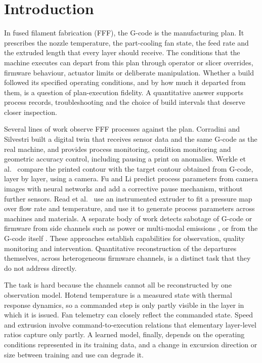 \documentclass[10pt,a4paper,twocolumn]{article}
\begin{document}
\section{Introduction}
In fused filament fabrication (FFF), the G-code is the manufacturing plan. It prescribes the nozzle temperature, the part-cooling fan state, the feed rate and the extruded length that every layer should receive. The conditions that the machine executes can depart from this plan through operator or slicer overrides, firmware behaviour, actuator limits or deliberate manipulation. Whether a build followed its specified operating conditions, and by how much it departed from them, is a question of plan-execution fidelity. A quantitative answer supports process records, troubleshooting and the choice of build intervals that deserve closer inspection.

Several lines of work observe FFF processes against the plan. Corradini and Silvestri \cite{Corradini2022} built a digital twin that receives sensor data and the same G-code as the real machine, and provides process monitoring, condition monitoring and geometric accuracy control, including pausing a print on anomalies. Werkle et al.\ \cite{Werkle2024} compare the printed contour with the target contour obtained from G-code, layer by layer, using a camera. Fu and Li \cite{FuLi2025} predict process parameters from camera images with neural networks and add a corrective pause mechanism, without further sensors. Read et al.\ \cite{Read2024} use an instrumented extruder to fit a pressure map over flow rate and temperature, and use it to generate process parameters across machines and materials. A separate body of work detects sabotage of G-code or firmware from side channels such as power or multi-modal emissions \cite{Yu2020,Moore2017}, or from the G-code itself \cite{Ali2025}. These approaches establish capabilities for observation, quality monitoring and intervention. Quantitative reconstruction of the departures themselves, across heterogeneous firmware channels, is a distinct task that they do not address directly.

The task is hard because the channels cannot all be reconstructed by one observation model. Hotend temperature is a measured state with thermal response dynamics, so a commanded step is only partly visible in the layer in which it is issued. Fan telemetry can closely reflect the commanded state. Speed and extrusion involve command-to-execution relations that elementary layer-level ratios capture only partly. A learned model, finally, depends on the operating conditions represented in its training data, and a change in excursion direction or size between training and use can degrade it.
\end{document}
